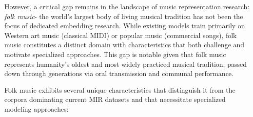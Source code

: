 \documentclass[]{interact}
\theoremstyle{plain}
\theoremstyle{definition}
\theoremstyle{remark}
\begin{document}
However, a critical gap remains in the landscape of music representation research: \textit{folk music}- the world's largest body of living musical tradition has not been the focus of dedicated embedding research. While existing models train primarily on Western art music (classical MIDI) or popular music (commercial songs), folk music constitutes a distinct domain with characteristics that both challenge and motivate specialized approaches. This gap is notable given that folk music represents humanity's oldest and most widely practiced musical tradition, passed down through generations via oral transmission and communal performance.

Folk music exhibits several unique characteristics that distinguish it from the corpora dominating current MIR datasets and that necessitate specialized modeling approaches:
\end{document}
